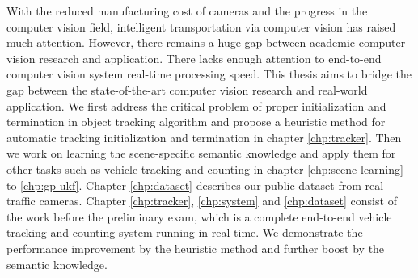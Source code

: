 \summary

With the reduced manufacturing cost of cameras and the progress in the computer vision field, intelligent transportation via computer vision has raised much attention.
However, there remains a huge gap between academic computer vision research and application. 
There lacks enough attention to end-to-end computer vision system real-time processing speed.
This thesis aims to bridge the gap between the state-of-the-art computer vision research and real-world application.
We first address the critical problem of proper initialization and termination in object tracking algorithm and propose a heuristic method for automatic tracking initialization and termination in chapter \ref{chp:tracker}.
Then we work on learning the scene-specific semantic knowledge and apply them for other tasks such as vehicle tracking and counting in chapter \ref{chp:scene-learning} to \ref{chp:gp-ukf}.
Chapter \ref{chp:dataset} describes our public dataset from real traffic cameras.
Chapter \ref{chp:tracker}, \ref{chp:system} and \ref{chp:dataset} consist of the work before  the preliminary exam, which is a complete end-to-end vehicle tracking and counting system running in real time.
We demonstrate the performance improvement by the heuristic method and further boost by the semantic knowledge.



